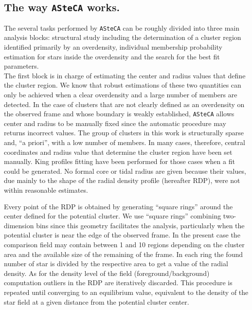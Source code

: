 \documentclass{aa}
\begin{document}
\subsection{The way \texttt{ASteCA} works.}
\label{ssec:asteca_works}

The several tasks performed by \texttt{ASteCA} can be roughly divided into three
main analysis blocks: structural study including the determination of a cluster
region identified primarily by an overdensity, individual membership probability
estimation for stars inside the overdensity and the search for the best fit
parameters.\\

The first block is in charge of estimating the center and radius values that
define the cluster region. We know that robust estimations
of these two quantities can only be achieved when a clear overdensity and a
large number of members are detected. In the case of clusters that are not
clearly defined as an overdensity on the observed frame and whose boundary is
weakly established, \texttt{ASteCA} allows center and radius to be manually
fixed since the automatic procedure may returns incorrect values. The group of
clusters in this work is structurally sparse and, ``a priori'', with a low
number of members.
In many cases, therefore, central coordinates and radius value that
determine the cluster region have been set manually. King profiles fitting have
been performed for those cases when a fit could be generated. No formal core or
tidal radius are given because their values, due mainly to the shape of the
radial density profile (hereafter RDP), were not within reasonable estimates.

Every point of the RDP is obtained by generating ``square rings'' around the
center defined for the potential cluster. We use ``square rings'' combining
two-dimension bins since
this geometry facilitates the analysis, particularly when the potential cluster
is near the edge of the observed frame. In the present case the comparison field
may contain between 1 and 10 regions depending on the cluster area and the
available size of the remaining of the frame. In each ring the found number of
star is divided by the respective area to get a value of the radial density. As
for the density level of the field (foreground/background) computation outliers
in the RDP are iteratively discarded. This procedure is repeated until
converging to an equilibrium value, equivalent to the density of the star field
at a given distance from the potential cluster center.\\
\end{document}

